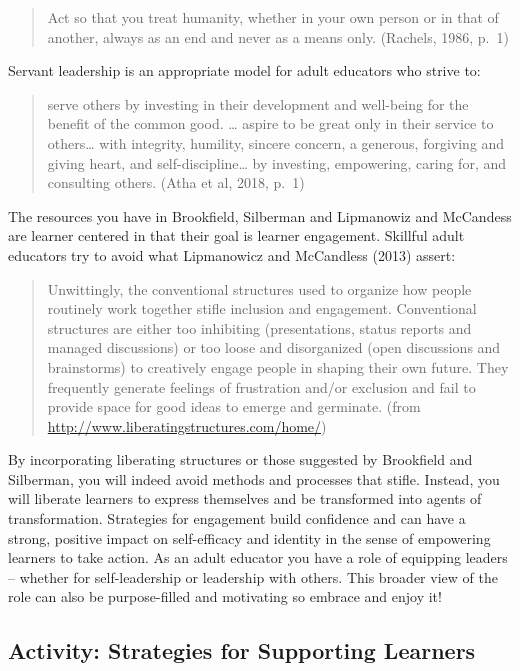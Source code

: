 \documentclass[
]{book}
\begin{document}
\begin{quote}
Act so that you treat humanity, whether in your own person or in that of another, always as an end and never as a means only. (Rachels, 1986, p.~1)
\end{quote}

Servant leadership is an appropriate model for adult educators who strive to:

\begin{quote}
serve others by investing in their development and well-being for the benefit of the common good. \ldots{} aspire to be great only in their service to others\ldots{} with integrity, humility, sincere concern, a generous, forgiving and giving heart, and self-discipline\ldots{} by investing, empowering, caring for, and consulting others. (Atha et al, 2018, p.~1)
\end{quote}

The resources you have in Brookfield, Silberman and Lipmanowiz and McCandess are learner centered in that their goal is learner engagement. Skillful adult educators try to avoid what Lipmanowicz and McCandless (2013) assert:

\begin{quote}
Unwittingly, the conventional structures used to organize how people routinely work together stifle inclusion and engagement. Conventional structures are either too inhibiting (presentations, status reports and managed discussions) or too loose and disorganized (open discussions and brainstorms) to creatively engage people in shaping their own future. They frequently generate feelings of frustration and/or exclusion and fail to provide space for good ideas to emerge and germinate. (from \url{http://www.liberatingstructures.com/home/})
\end{quote}

By incorporating liberating structures or those suggested by Brookfield and Silberman, you will indeed avoid methods and processes that stifle. Instead, you will liberate learners to express themselves and be transformed into agents of transformation. Strategies for engagement build confidence and can have a strong, positive impact on self-efficacy and identity in the sense of empowering learners to take action. As an adult educator you have a role of equipping leaders -- whether for self-leadership or leadership with others. This broader view of the role can also be purpose-filled and motivating so embrace and enjoy it!

\hypertarget{activity-strategies-for-supporting-learners}{%
\subsection*{Activity: Strategies for Supporting Learners}\label{activity-strategies-for-supporting-learners}}
\end{document}
